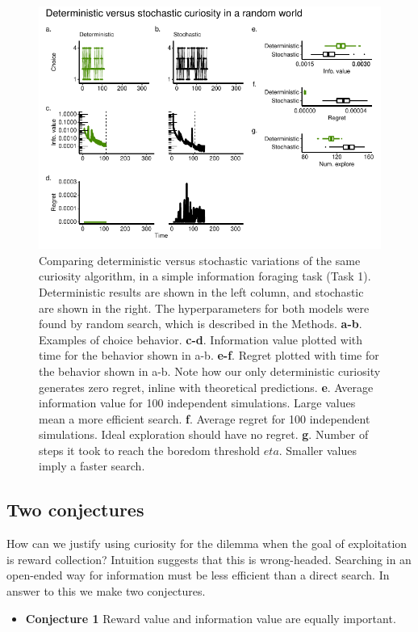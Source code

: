 \begin{figure}
	\begin{fullwidth}
	\includegraphics[width=.7\linewidth]{img/curiosity1.pdf} 
	\caption{Comparing deterministic versus stochastic variations of the same curiosity algorithm, in a simple information foraging task (Task 1). Deterministic results are shown in the left column, and stochastic are shown in the right. The hyperparameters for both models were found by random search, which is described in the Methods.
	\textbf{a-b}. Examples of choice behavior.
	\textbf{c-d}. Information value plotted with time for the behavior shown in a-b.
	\textbf{e-f}. Regret plotted with time for the behavior shown in a-b. Note how our only deterministic curiosity generates zero regret, inline with theoretical predictions.
	\textbf{e}. Average information value for 100 independent simulations. Large values mean a more efficient search.
	\textbf{f}. Average regret for 100 independent simulations. Ideal exploration should have no regret. 
	\textbf{g}. Number of steps it took to reach the boredom threshold $eta$. Smaller values imply a faster search.
	}
	\label{fig:curiosity1} 
	\end{fullwidth}
\end{figure}

\subsection{Two conjectures}
How can we justify using curiosity for the dilemma when the goal of exploitation is reward collection? Intuition suggests that this is wrong-headed. Searching in an open-ended way for information must be less efficient than a direct search. In answer to this we make two conjectures.

\begin{itemize}
	\item \textbf{Conjecture 1} Reward value and information value are equally important.
\end{itemize}

